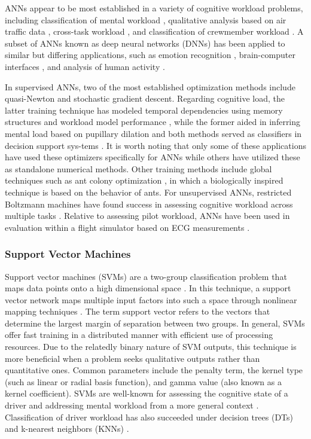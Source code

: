 \documentclass[12pt]{uthesis-v12}  %
\begin{document}
ANNs appear to be most established in a variety of cognitive workload problems, including classification of mental workload \cite{wilson,wilson2,wilson3}, qualitative analysis based on air traffic data \cite{chatterji}, cross-task workload \cite{wilson, baldwin}, and classification of crewmember workload \cite{laine}. A subset of ANNs known as deep neural networks (DNNs) has been applied to similar but differing applications, such as emotion recognition \cite{zheng}, brain-computer interfaces \cite{hennrich}, and analysis of human activity \cite{sarkar}.

In supervised ANNs, two of the most established optimization methods include quasi-Newton and stochastic gradient descent. Regarding cognitive load, the latter training technique has modeled temporal dependencies using memory structures \cite{hefron} and workload model performance \cite{gianazza}, while the former aided in inferring mental load based on pupillary dilation \cite{juhaniak} and both methods served as classifiers in decision support sys-tems \cite{tran}. It is worth noting that only some of these applications have used these optimizers specifically for ANNs while others have utilized these as standalone numerical methods. Other training methods include global techniques such as ant colony optimization \cite{mavr}, in which a biologically inspired technique is based on the behavior of ants. For unsupervised ANNs, restricted Boltzmann machines have found success in assessing cognitive workload across multiple tasks \cite{ziegler}. Relative to assessing pilot workload, ANNs have been used in evaluation within a flight simulator based on ECG measurements \cite{hannula}.

\subsubsection{Support Vector Machines}

Support vector machines (SVMs) are a two-group classification problem that maps data points onto a high dimensional space \cite{cortes}. In this technique, a support vector network maps multiple input factors into such a space through nonlinear mapping techniques \cite{cortes}. The term support vector refers to the vectors that determine the largest margin of separation between two groups. In general, SVMs offer fast training in a distributed manner with efficient use of processing resources. Due to the relatedly binary nature of SVM outputs, this technique is more beneficial when a problem seeks qualitative outputs rather than quantitative ones. Common parameters include the penalty term, the kernel type (such as linear or radial basis function), and gamma value (also known as a kernel coefficient). SVMs are well-known for assessing the cognitive state of a driver \cite{jin, son, putze, liang} and addressing mental workload from a more general context \cite{ziegler, yin}. Classification of driver workload has also succeeded under decision trees (DTs) and k-nearest neighbors (KNNs) \cite{solovey}.
\end{document}
